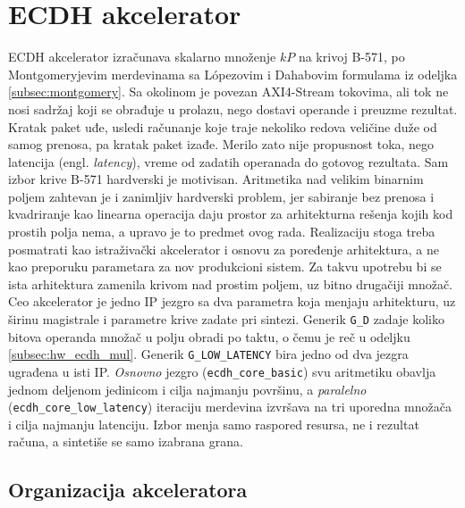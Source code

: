 \section{ECDH akcelerator}
\label{sec:hw_ecdh}

ECDH akcelerator izračunava skalarno množenje $kP$ na krivoj B-571, po Montgomeryjevim merdevinama sa Lópezovim i Dahabovim formulama iz odeljka \ref{subsec:montgomery}. Sa okolinom je povezan AXI4-Stream tokovima, ali tok ne nosi sadržaj koji se obrađuje u prolazu, nego dostavi operande i preuzme rezultat. Kratak paket uđe, usledi računanje koje traje nekoliko redova veličine duže od samog prenosa, pa kratak paket izađe. Merilo zato nije propusnost toka, nego latencija (engl. \textit{latency}), vreme od zadatih operanada do gotovog rezultata.
\smallbreak
Sam izbor krive B-571 hardverski je motivisan. Aritmetika nad velikim binarnim poljem zahtevan je i zanimljiv hardverski problem, jer sabiranje bez prenosa i kvadriranje kao linearna operacija daju prostor za arhitekturna rešenja kojih kod prostih polja nema, a upravo je to predmet ovog rada. Realizaciju stoga treba posmatrati kao istraživački akcelerator i osnovu za poređenje arhitektura, a ne kao preporuku parametara za nov produkcioni sistem. Za takvu upotrebu bi se ista arhitektura zamenila krivom nad prostim poljem, uz bitno drugačiji množač.
\smallbreak
Ceo akcelerator je jedno IP jezgro sa dva parametra koja menjaju arhitekturu, uz širinu magistrale i parametre krive zadate pri sintezi. Generik \texttt{G\_D} zadaje koliko bitova operanda množač u polju obradi po taktu, o čemu je reč u odeljku \ref{subsec:hw_ecdh_mul}. Generik \texttt{G\_LOW\_LATENCY} bira jedno od dva jezgra ugrađena u isti IP. \textit{Osnovno} jezgro (\texttt{ecdh\_core\_basic}) svu aritmetiku obavlja jednom deljenom jedinicom i cilja najmanju površinu, a \textit{paralelno} (\texttt{ecdh\_core\_low\_latency}) iteraciju merdevina izvršava na tri uporedna množača i cilja najmanju latenciju. Izbor menja samo raspored resursa, ne i rezultat računa, a sintetiše se samo izabrana grana.

\subsection{Organizacija akceleratora}
\label{subsec:hw_ecdh_org}

